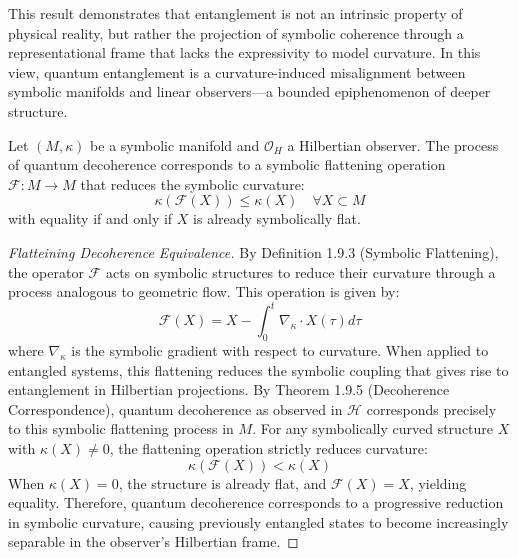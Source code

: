 \begin{remark}
\label{remark:bk8_entanglement_is_observer_bound}
This result demonstrates that entanglement is not an intrinsic property of physical reality, but rather the projection of symbolic coherence through a representational frame that lacks the expressivity to model curvature. In this view, quantum entanglement is a curvature-induced misalignment between symbolic manifolds and linear observers—a bounded epiphenomenon of deeper structure.
\end{remark}
\begin{proposition}
\label{prop:bk8_operator_curvature_flux}
Let $(M, \kappa)$ be a symbolic manifold and $\mathcal{O}_H$ a Hilbertian observer. The process of quantum decoherence corresponds to a symbolic flattening operation $\mathcal{F}: M \to M$ that reduces the symbolic curvature:
\[
\kappa(\mathcal{F}(X)) \leq \kappa(X) \quad \forall X \subset M
\]
with equality if and only if $X$ is already symbolically flat.
\end{proposition}
\begin{proof}[Flatteining Decoherence Equivalence]
\label{proof:bk8_flattening_decoherence_equivalence}
By Definition 1.9.3 (Symbolic Flattening), the operator $\mathcal{F}$ acts on symbolic structures to reduce their curvature through a process analogous to geometric flow. This operation is given by:
\begin{equation}
\mathcal{F}(X) = X - \int_0^t \nabla_{\kappa} \cdot X(\tau) d\tau
\end{equation}
where $\nabla_{\kappa}$ is the symbolic gradient with respect to curvature.
When applied to entangled systems, this flattening reduces the symbolic coupling that gives rise to entanglement in Hilbertian projections. By Theorem 1.9.5 (Decoherence Correspondence), quantum decoherence as observed in $\mathcal{H}$ corresponds precisely to this symbolic flattening process in $M$.
For any symbolically curved structure $X$ with $\kappa(X) \neq 0$, the flattening operation strictly reduces curvature:
\begin{equation}
\kappa(\mathcal{F}(X)) < \kappa(X)
\end{equation}
When $\kappa(X) = 0$, the structure is already flat, and $\mathcal{F}(X) = X$, yielding equality.
Therefore, quantum decoherence corresponds to a progressive reduction in symbolic curvature, causing previously entangled states to become increasingly separable in the observer's Hilbertian frame.
\end{proof}
